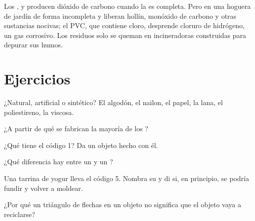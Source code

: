 \begin{remark}\label{rem:g8:plastics:burning}
Los  , y producen dióxido de carbono cuando la 
es completa. Pero en una hoguera de jardín  de forma incompleta y
liberan hollín, monóxido de carbono y otras sustancias nocivas; el PVC,
que contiene cloro, desprende cloruro de hidrógeno, un gas corrosivo.
Los residuos  solo se queman en incineradoras construidas para
depurar sus humos.
\end{remark}

\section{Ejercicios}

\begin{exercise}[$\star$]\label{exo:g8:plastics:1}
¿Natural, artificial o sintético? El algodón, el nailon, el papel, la
lana, el poliestireno, la viscosa.
\end{exercise}

\begin{exercise}[$\star$]\label{exo:g8:plastics:2}
¿A partir de qué  se fabrican la mayoría de los ?
\end{exercise}

\begin{exercise}[$\star$]\label{exo:g8:plastics:3}
¿Qué  tiene el código 1? Da un objeto hecho con él.
\end{exercise}

\begin{exercise}[$\star$]\label{exo:g8:plastics:4}
¿Qué diferencia hay entre un  y un ?
\end{exercise}

\begin{exercise}[$\star\star$]\label{exo:g8:plastics:5}
Una tarrina de yogur lleva el código 5. Nombra su  y di si, en
principio, se podría fundir y volver a moldear.
\end{exercise}

\begin{exercise}[$\star\star$]\label{exo:g8:plastics:6}
¿Por qué un triángulo de flechas en un objeto no significa que el objeto
vaya a reciclarse?
\end{exercise}

